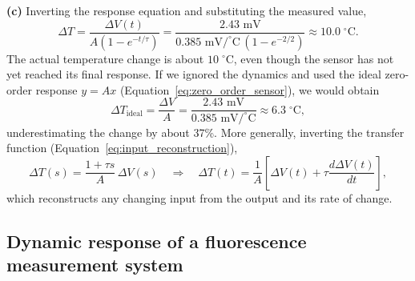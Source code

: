 \textbf{(c)} Inverting the response equation and substituting the measured value,
\begin{equation*}
\Delta T = \frac{\Delta V(t)}{A\left(1 - e^{-t/\tau}\right)} = \frac{2.43\text{ mV}}{0.385\text{ mV}/^\circ\text{C}\,\left(1 - e^{-2/2}\right)} \approx 10.0\;^\circ\text{C}.
\end{equation*}
The actual temperature change is about $10\;^\circ\text{C}$, even though the sensor has not yet reached its final response. If we ignored the dynamics and used the ideal zero-order response $y = Ax$ (Equation~\eqref{eq:zero_order_sensor}), we would obtain
\begin{equation*}
\Delta T_{\text{ideal}} = \frac{\Delta V}{A} = \frac{2.43\text{ mV}}{0.385\text{ mV}/^\circ\text{C}} \approx 6.3\;^\circ\text{C},
\end{equation*}
underestimating the change by about 37\%. More generally, inverting the transfer function (Equation~\eqref{eq:input_reconstruction}),
\begin{equation*}
\Delta T(s) = \frac{1 + \tau s}{A}\,\Delta V(s) \quad \Longrightarrow \quad \Delta T(t) = \frac{1}{A}\left[\Delta V(t) + \tau\frac{d\Delta V(t)}{dt}\right],
\end{equation*}
which reconstructs any changing input from the output and its rate of change.

\subsection{Dynamic response of a fluorescence measurement system}
\label{ex:fluorescence_dynamics}


